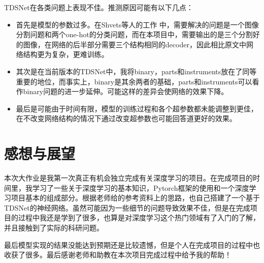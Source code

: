 \documentclass[UTF8]{ctexart}
\begin{document}
TDSNet在各类问题上表现不佳。推测原因可能有以下几点：
\begin{itemize}
    \item 首先是模型的参数过多。在Shvets等人\cite{shvets2018automatic}的工作
    中，需要解决的问题是一个图像分割问题和两个one-hot的分类问题，而在本项目中，需要输出的是三个分割好的图像，在网络的后半部分需要三个结构相同的decoder，因此相比原文中网络结构更为复杂，更难训练。
    \item 其次是在当前版本的TDSNet中，我将binary，parts和instruments放在了同等重要的地位，而事实上，binary是其余两者的基础，parts和instruments可以看作binary问题的进一步延伸。可能这样的差异会使网络的效果下降。
    \item 最后是可能由于时间有限，模型的训练过程和各个超参数都未能调整到更佳，在不改变网络结构的情况下通过改变超参数也可能回答道更好的效果。
\end{itemize}


\section{感想与展望}
本次大作业是我第一次真正有机会独立完成有关深度学习的项目。在完成项目的时间里，我学习了一些关于深度学习的基本知识，Pytorch框架的使用和一个深度学习项目基本的组成部分。根据老师给的参考资料上的思路，也自己搭建了一个基于TDSNet的神经网络。虽然可能因为一些细节的问题导致效果不佳，但是在完成项目的过程中我还是学到了很多，也算是对深度学习这个热门领域有了入门的了解，并且接触到了实际的科研问题。

最后模型实现的结果没能达到预期还是比较遗憾，但是个人在完成项目的过程中也收获了很多。最后感谢老师和助教在本次项目完成过程中给予我的帮助！



\end{document}
